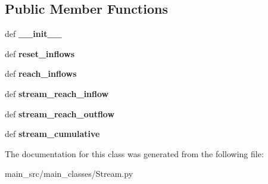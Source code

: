 \subsection*{Public Member Functions}
\begin{DoxyCompactItemize}
\item 
\hypertarget{classmain__src_1_1main__classes_1_1Stream_1_1StreamPass_a3e5222244d7a0af65108de69ec9fe2d4}{def {\bfseries \-\_\-\-\_\-init\-\_\-\-\_\-}}\label{classmain__src_1_1main__classes_1_1Stream_1_1StreamPass_a3e5222244d7a0af65108de69ec9fe2d4}

\item 
\hypertarget{classmain__src_1_1main__classes_1_1Stream_1_1StreamPass_a10016f865fa6c96640115825d12799f6}{def {\bfseries reset\-\_\-inflows}}\label{classmain__src_1_1main__classes_1_1Stream_1_1StreamPass_a10016f865fa6c96640115825d12799f6}

\item 
\hypertarget{classmain__src_1_1main__classes_1_1Stream_1_1StreamPass_abc3ac5effc6e668eca33d62856f5b57c}{def {\bfseries reach\-\_\-inflows}}\label{classmain__src_1_1main__classes_1_1Stream_1_1StreamPass_abc3ac5effc6e668eca33d62856f5b57c}

\item 
\hypertarget{classmain__src_1_1main__classes_1_1Stream_1_1StreamPass_aa335264c9dbf72aa7bfa5648a3437e4c}{def {\bfseries stream\-\_\-reach\-\_\-inflow}}\label{classmain__src_1_1main__classes_1_1Stream_1_1StreamPass_aa335264c9dbf72aa7bfa5648a3437e4c}

\item 
\hypertarget{classmain__src_1_1main__classes_1_1Stream_1_1StreamPass_a47c984325c6bbf4741b68b97e033d590}{def {\bfseries stream\-\_\-reach\-\_\-outflow}}\label{classmain__src_1_1main__classes_1_1Stream_1_1StreamPass_a47c984325c6bbf4741b68b97e033d590}

\item 
\hypertarget{classmain__src_1_1main__classes_1_1Stream_1_1StreamPass_af5b785a34cfa7839e7dd8ff1a340fad6}{def {\bfseries stream\-\_\-cumulative}}\label{classmain__src_1_1main__classes_1_1Stream_1_1StreamPass_af5b785a34cfa7839e7dd8ff1a340fad6}

\end{DoxyCompactItemize}


The documentation for this class was generated from the following file\-:\begin{DoxyCompactItemize}
\item 
main\-\_\-src/main\-\_\-classes/Stream.\-py\end{DoxyCompactItemize}
